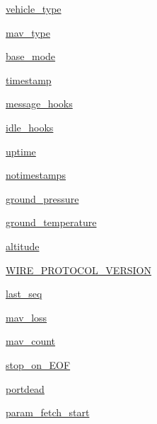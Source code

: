 \begin{DoxyCompactItemize}
\item 
\mbox{\hyperlink{classpymavlink_1_1mavutil_1_1mavfile_a7a95b597163c1661c47ee3f3b1ced072}{vehicle\+\_\+type}}
\item 
\mbox{\hyperlink{classpymavlink_1_1mavutil_1_1mavfile_aedfd4f8385f7dece207420bfbfafb5d3}{mav\+\_\+type}}
\item 
\mbox{\hyperlink{classpymavlink_1_1mavutil_1_1mavfile_afe55f45b7160244078a3825f22667935}{base\+\_\+mode}}
\item 
\mbox{\hyperlink{classpymavlink_1_1mavutil_1_1mavfile_af135ef21b91f88dc3a4d15690a7bd137}{timestamp}}
\item 
\mbox{\hyperlink{classpymavlink_1_1mavutil_1_1mavfile_a471c714f4891bc8908c050cce7c09e1f}{message\+\_\+hooks}}
\item 
\mbox{\hyperlink{classpymavlink_1_1mavutil_1_1mavfile_accae39f4c0613319cb19b951922a0324}{idle\+\_\+hooks}}
\item 
\mbox{\hyperlink{classpymavlink_1_1mavutil_1_1mavfile_a37502153c0413757a34aa2bbe7b9db54}{uptime}}
\item 
\mbox{\hyperlink{classpymavlink_1_1mavutil_1_1mavfile_a2743806ba71f58e0dc8a98d76e07f7c9}{notimestamps}}
\item 
\mbox{\hyperlink{classpymavlink_1_1mavutil_1_1mavfile_ad4a99a4e70e5ea1875078f6addacf8bb}{ground\+\_\+pressure}}
\item 
\mbox{\hyperlink{classpymavlink_1_1mavutil_1_1mavfile_a4eb1b54f916d08a9ba1d2dcb8f7139e2}{ground\+\_\+temperature}}
\item 
\mbox{\hyperlink{classpymavlink_1_1mavutil_1_1mavfile_a5d9a3ac5666250fe617cb5df530c8082}{altitude}}
\item 
\mbox{\hyperlink{classpymavlink_1_1mavutil_1_1mavfile_a48a9748e550310c4c276857ff0712b96}{W\+I\+R\+E\+\_\+\+P\+R\+O\+T\+O\+C\+O\+L\+\_\+\+V\+E\+R\+S\+I\+ON}}
\item 
\mbox{\hyperlink{classpymavlink_1_1mavutil_1_1mavfile_a2bad0eb3f322ff7dab356b4e07ae8f4a}{last\+\_\+seq}}
\item 
\mbox{\hyperlink{classpymavlink_1_1mavutil_1_1mavfile_afaa7723444c1f5a24d284a0d23e299e2}{mav\+\_\+loss}}
\item 
\mbox{\hyperlink{classpymavlink_1_1mavutil_1_1mavfile_af7e0abc5cb1258cfcdec3a683cd61bdb}{mav\+\_\+count}}
\item 
\mbox{\hyperlink{classpymavlink_1_1mavutil_1_1mavfile_adabc25442afa8c8d23132d3a344b8ef9}{stop\+\_\+on\+\_\+\+E\+OF}}
\item 
\mbox{\hyperlink{classpymavlink_1_1mavutil_1_1mavfile_a6a96d664dc258cd8bcf82c84aea68780}{portdead}}
\item 
\mbox{\hyperlink{classpymavlink_1_1mavutil_1_1mavfile_a44f3d71dd47d94e8c1b52a60eb036982}{param\+\_\+fetch\+\_\+start}}
\end{DoxyCompactItemize}


